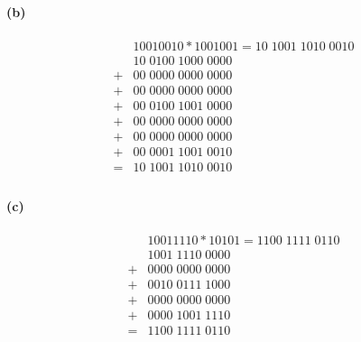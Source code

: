 \documentclass[a4paper]{article}
\begin{document}
\paragraph{(b)}
\begin{align*}
    &10010010*1001001=10\;1001\;1010\;0010\\
    &10\;0100\;1000\;0000\\
    +&00\;0000\;0000\;0000\\
    +&00\;0000\;0000\;0000\\
    +&00\;0100\;1001\;0000\\
    +&00\;0000\;0000\;0000\\
    +&00\;0000\;0000\;0000\\
    +&00\;0001\;1001\;0010\\
    =&10\;1001\;1010\;0010\\
\end{align*}


\paragraph{(c)}
\begin{align*}
    &10011110*10101=1100\;1111\;0110\\
    &1001\;1110\;0000\\
    +&0000\;0000\;0000\\
    +&0010\;0111\;1000\\
    +&0000\;0000\;0000\\
    +&0000\;1001\;1110\\
    =&1100\;1111\;0110\\
\end{align*}
\end{document}
